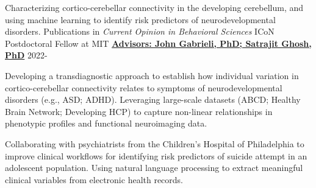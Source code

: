 

\begin{cventries}

  \cventry
    {Characterizing cortico-cerebellar connectivity in the developing cerebellum, and using machine learning to identify risk predictors of neurodevelopmental disorders. Publications in \textit{Current Opinion in Behavioral Sciences}}
    {ICoN Postdoctoral Fellow at MIT} %
    {\href{https://maedbhk.github.io/MIT-Projects/}{\textbf{Advisors: John Gabrieli, PhD; Satrajit Ghosh, PhD}}}
    {2022-} %
    {
      \begin{cvitems} %
		\item {Developing a transdiagnostic approach to establish how individual variation in cortico-cerebellar connectivity relates to symptoms of neurodevelopmental disorders (e.g., ASD; ADHD). Leveraging large-scale datasets (ABCD; Healthy Brain Network; Developing HCP) to capture non-linear relationships in phenotypic profiles and functional neuroimaging data.}
		\item {Collaborating with psychiatrists from the Children's Hospital of Philadelphia to improve clinical workflows for identifying risk predictors of suicide attempt in an adolescent population. Using natural language processing to extract meaningful clinical variables from electronic health records.}
		\end{cvitems}
    }


\end{cventries}
